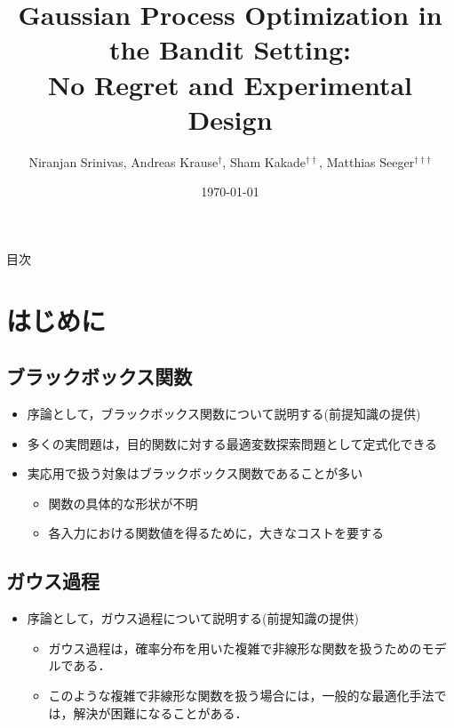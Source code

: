 \documentclass[dvipdfmx, 10.5pt]{beamer}
\title[]{Gaussian Process Optimization in the Bandit Setting:\\No Regret and Experimental Design}
\subtitle{}
\author[]{Niranjan Srinivas, Andreas Krause$^{\dag}$, Sham Kakade$^{\dag\dag}$, Matthias Seeger$^{\dag\dag\dag}$}
\date[\today]{\today}
\institute[]{$\dag$: California Institute of Technology\\
$\dag\dag$: University of Pennsylvania\\
$\dag\dag\dag$: Saarland University}
\begin{document}

\begin{frame}
\maketitle%
\thispagestyle{empty}%
\end{frame}



\begin{frame}[noframenumbering]{目次}
	\tableofcontents[hideallsubsections]
	\thispagestyle{empty} %
\end{frame}

\section{はじめに}

\subsection{ブラックボックス関数}
\begin{frame}{\insertsubsection}
	\begin{itemize}
		\item 序論として，ブラックボックス関数について説明する(前提知識の提供)
		\item 多くの実問題は，目的関数に対する最適変数探索問題として定式化できる
		\item 実応用で扱う対象はブラックボックス関数であることが多い
		\begin{itemize}
			\item 関数の具体的な形状が不明
			\item 各入力における関数値を得るために，\alert{大きなコストを要する}
		\end{itemize}
	\end{itemize}
\end{frame}


\subsection{ガウス過程}
\begin{frame}{\insertsubsection}
	\begin{itemize}
		\item 序論として，ガウス過程について説明する(前提知識の提供)
		\begin{itemize}
			\item ガウス過程は，確率分布を用いた複雑で非線形な関数を扱うためのモデルである．
			\item このような複雑で非線形な関数を扱う場合には，一般的な最適化手法では，解決が困難になることがある．
		\end{itemize}
	\end{itemize}


\end{frame}
\end{document}
